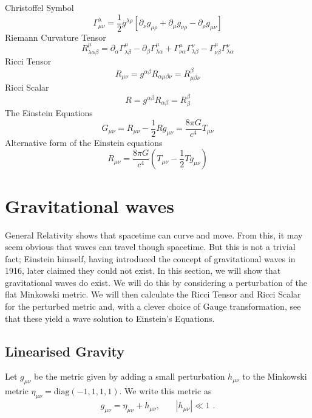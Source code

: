 \documentclass[11pt]{cuthesis}
\newcommand{\mn}{_{\mu\nu}}
\begin{document}
Christoffel Symbol
\begin{equation} \label{christ}
\Gamma^\lambda\mn=\frac{1}{2}g^{\lambda \rho} [\partial_\nu g_{\mu \rho} + \partial_\mu g_{\nu \rho}-\partial_\rho g\mn]
\end{equation}
Riemann Curvature Tensor  
\begin{equation} \label{rct}
R^\mu_{\lambda \alpha \beta} = \partial_\alpha \Gamma^\mu_{\lambda \beta} -\partial_\beta \Gamma^\mu_{\lambda \alpha} + \Gamma^\mu_{\nu \alpha} \Gamma^\nu_{\lambda \beta} - \Gamma^\mu_{\nu \beta} \Gamma^\nu_{\lambda \alpha}
\end{equation}
Ricci Tensor
\begin{equation} \label{rt}
R\mn=g^{\alpha \beta} R_{\alpha \mu \beta \nu}=R^\beta_{\mu \beta \nu}
\end{equation}
Ricci Scalar
\begin{equation} \label{rs}
R=g^{\alpha \beta}R_{\alpha \beta}=R^\beta_\beta
\end{equation}
The Einstein Equations
\begin{equation} \label{eineq}
G\mn =R\mn -\frac{1}{2} R g\mn=\frac{8 \pi G}{c^4}T\mn
\end{equation}
Alternative form of the Einstein equations
\begin{equation} \label{alt einstein}
R\mn = \frac{8 \pi G}{c^4}\left( T\mn - \frac{1}{2}Tg\mn \right) 
\end{equation}


\section{Gravitational waves}
General Relativity shows that spacetime can curve and move. From this, it may seem obvious that waves can travel though spacetime. But this is not a trivial fact; Einstein himself, having introduced the concept of gravitational waves in 1916, later claimed they could not exist. In this section, we will show that gravitational waves do exist. We will do this by considering a perturbation of the flat Minkowski metric. We will then calculate the Ricci Tensor and Ricci Scalar for the perturbed metric and, with a clever choice of Gauge transformation, see that these yield a wave solution to Einstein's Equations. 

\subsection{Linearised Gravity}
Let $g\mn$ be the metric given by adding a small perturbation $h_{\mu\nu}$ to the Minkowski metric $\eta\mn=\text{diag}(-1,1,1,1)$. We write this metric as 
\begin{equation} \label{pert metric}
g\mn=\eta_{\mu\nu}+h_{\mu\nu} \text{, } \hspace{20pt} |h_{\mu\nu}| \ll 1 \text{ .}
\end{equation}
\end{document}
